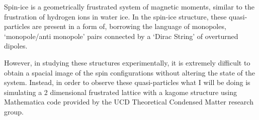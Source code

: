 \par
Spin-ice is a geometrically frustrated system of magnetic moments, similar to the frustration of hydrogen ions in water ice.  In the spin-ice structure, these quasi-particles are present in a form of, borrowing the language of monopoles, `monopole/anti monopole' pairs connected by a `Dirac String' of overturned dipoles.
\par
However, in studying these structures experimentally, it is extremely difficult to obtain a spacial image of the spin configurations without altering the state of the system. Instead, in order to observe these quasi-particles what I will be doing is simulating a 2 dimensional frustrated lattice with a kagome structure using Mathematica code provided by the UCD Theoretical Condensed Matter research group.
\clearpage
